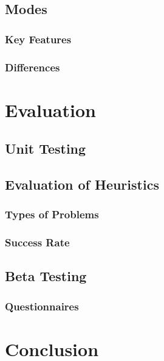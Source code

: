 \documentclass{l4proj}
\begin{document}
\section{Modes}

\subsection{Key Features}


\subsection{Differences}










\chapter{Evaluation}

\section{Unit Testing}

\section{Evaluation of Heuristics}
\subsection{Types of Problems}
\subsection{Success Rate}

\section{Beta Testing}
\subsection{Questionnaires}






\chapter{Conclusion}
\end{document}
